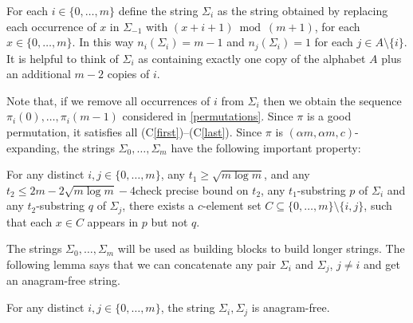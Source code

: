 \documentclass[kpfonts]{patmorin}
\newcommand{\condref}[1]{(C\ref{#1})}
\begin{document}
For each $i\in\{0,\ldots,m\}$ define the string $\Sigma_i$ as the string obtained by replacing each occurrence of $x$ in $\Sigma_{-1}$ with $(x+i+1)\bmod (m+1)$, for each $x\in\{0,\ldots,m\}$.  In this way $n_i(\Sigma_i) = m-1$ and $n_j(\Sigma_i)=1$ for each $j\in A\setminus\{i\}$. It is helpful to think of $\Sigma_i$ as containing exactly one copy of the alphabet $A$ plus an additional $m-2$ copies of $i$.

Note that, if we remove all occurrences of $i$ from $\Sigma_i$ then we obtain the sequence $\pi_i(0),\ldots,\pi_i(m-1)$ considered in \cref{permutations}.
 Since $\pi$ is a good permutation, it satisfies all \condref{first}--\condref{last}.  Since $\pi$ is $(\alpha m,\alpha m, c)$-expanding, the strings $\Sigma_0,\ldots,\Sigma_m$ have the following important property:

\begin{obs}\label{killer}
    For any distinct $i,j\in\{0,\ldots,m\}$, any $t_1\ge \sqrt{m\log m}$, and any $t_2\le 2m-2\sqrt{m\log m}-4${check precise bound on $t_2$}, any $t_1$-substring $p$ of $\Sigma_i$ and any $t_2$-substring $q$ of $\Sigma_j$, there exists a $c$-element set $C\subseteq\{0,\ldots,m\}\setminus\{i,j\}$, such that each $x\in C$ appears in $p$ but not $q$.
\end{obs}

The strings $\Sigma_0,\ldots,\Sigma_m$ will be used as building blocks to build longer strings.  The following lemma says that we can concatenate any pair $\Sigma_i$ and $\Sigma_j$, $j\neq i$ and get an anagram-free string.

\begin{lem}\label{pairs}
    For any distinct $i,j\in\{0,\ldots,m\}$, the string $\Sigma_i,\Sigma_j$ is anagram-free.
\end{lem}
\end{document}
